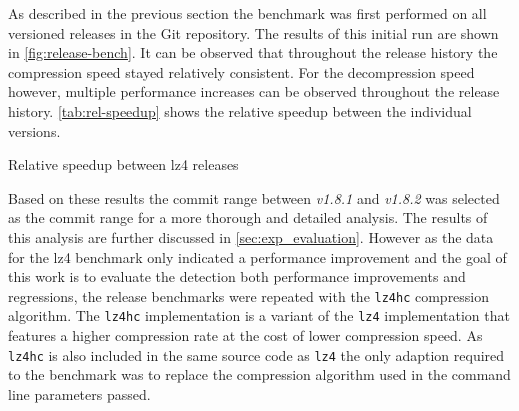 \documentclass[	runningheads,
				a4paper]{llncs}
\begin{document}
	As described in the previous section the benchmark was first performed on all versioned releases in the Git repository. The results of this initial run are shown in \autoref{fig:release-bench}. It can be observed that throughout the release history the compression speed stayed relatively consistent. For the decompression speed however, multiple performance increases can be observed throughout the release history. \autoref{tab:rel-speedup} shows the relative speedup between the individual versions.

	\begin{table}
		\caption{Relative speedup between lz4 releases}
		\label{tab:rel-speedup}
	\end{table}

	Based on these results the commit range between \textit{v1.8.1} and \textit{v1.8.2} was selected as the commit range for a more thorough and detailed analysis. The results of this analysis are further discussed in \autoref{sec:exp_evaluation}. However as the data for the lz4 benchmark only indicated a performance improvement and the goal of this work is to evaluate the detection both performance improvements and regressions, the release benchmarks were repeated with the \texttt{lz4hc} compression algorithm. The \texttt{lz4hc} implementation is a variant of the \texttt{lz4} implementation that features a higher compression rate at the cost of lower compression speed. As \texttt{lz4hc} is also included in the same source code as \texttt{lz4} the only adaption required to the benchmark was to replace the compression algorithm used in the command line parameters passed.
\end{document}

